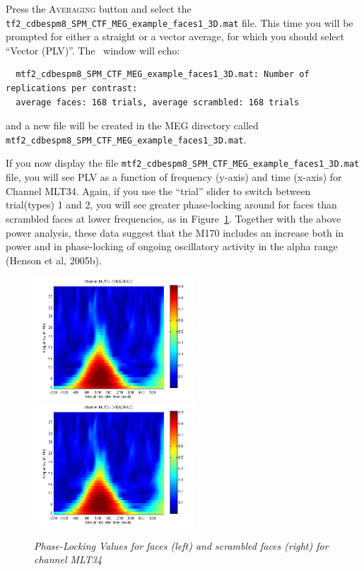 Press the \textsc{Averaging} button and select the \texttt{tf2\_\-cdbespm8\_\-SPM\_\-CTF\_\-MEG\_\-example\_\-faces1\_\-3D.mat} file. This time you will be prompted for either a straight or a vector average, for which you should select ``Vector (PLV)''. The \matlab\ window will echo:

\begin{verbatim}
  mtf2_cdbespm8_SPM_CTF_MEG_example_faces1_3D.mat: Number of replications per contrast:
  average faces: 168 trials, average scrambled: 168 trials
\end{verbatim}

and a new file will be created in the MEG directory called \texttt{mtf2\_\-cdbespm8\_\-SPM\_\-CTF\_\-MEG\_\-example\_\-faces1\_\-3D.mat}.

If you now display the file \texttt{mtf2\_\-cdbespm8\_\-SPM\_\-CTF\_\-MEG\_\-example\_\-faces1\_\-3D.mat} file, you will see PLV as a function of frequency (y-axis) and time (x-axis) for Channel MLT34. Again, if you use the ``trial'' slider to switch between trial(types) 1 and 2, you will see greater phase-locking around for faces than scrambled faces at lower frequencies, as in Figure~\ref{multimodal:fig:14}. Together with the above power analysis, these data suggest that the M170 includes an increase both in power and in phase-locking of ongoing oscillatory activity in the alpha range (Henson et al, 2005b).

\begin{figure}
\begin{center}
\includegraphics[width=60mm]{multimodal/figures/meg_plv_faces}
\includegraphics[width=60mm]{multimodal/figures/meg_plv_faces}
\caption{\em Phase-Locking Values for faces (left) and scrambled faces (right) for channel MLT34 \label{multimodal:fig:14}}
\end{center}
\end{figure}

